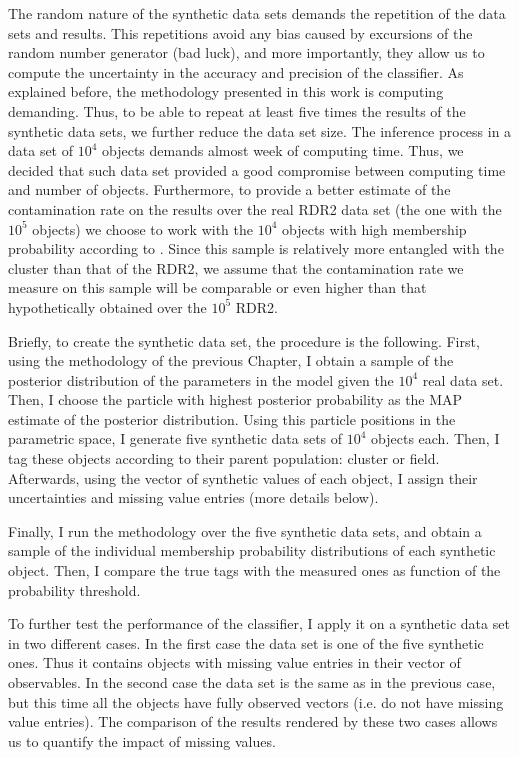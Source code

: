 The random nature of the synthetic data sets demands the repetition of the data sets and results. This repetitions avoid any bias caused by excursions of the random number generator (bad luck), and more importantly, they allow us to compute the uncertainty in the accuracy and precision of the classifier. As explained before, the methodology presented in this work is computing demanding. Thus, to be able to repeat at least five times the results of the synthetic data sets, we further reduce the data set size. The inference process in a data set of $10^4$ objects demands almost week of computing time. Thus, we decided that such data set provided a good compromise between computing time and number of objects. Furthermore, to provide a better estimate of the contamination rate on the results over the real RDR2 data set (the one with the $10^5$ objects) we choose to work with the $10^4$ objects with high membership probability according to \citet{Bouy2015}. Since this sample is relatively more entangled with the cluster than that of the RDR2, we assume that the contamination rate we measure on this sample will be comparable or even higher than that hypothetically obtained over the $10^5$ RDR2. 

Briefly, to create the synthetic data set, the procedure is the following. First, using the methodology of the previous Chapter, I obtain a sample of the posterior distribution of the parameters in the model given the $10^4$ real data set. Then, I choose the particle with highest posterior probability as the MAP estimate of the posterior distribution. Using this particle positions in the parametric space, I generate five synthetic data sets of $10^4$ objects each. Then, I tag these objects according to their parent population: cluster or field. Afterwards, using the vector of synthetic values of each object, I assign their uncertainties and missing value entries (more details  below).

Finally, I run the methodology over the five synthetic data sets, and obtain a sample of the individual membership probability distributions of each synthetic object. Then, I compare the true tags with the measured ones as function of the probability threshold. 

To further test the performance of the classifier, I apply it on a synthetic data set in two different cases. In the first case the data set is one of the five synthetic ones. Thus it contains objects with missing value entries in their vector of observables.  In the second case the data set is the same as in the previous case, but this time all the objects have fully observed vectors (i.e. do not have missing value entries). The comparison of the results rendered by these two cases allows us to quantify the impact of missing values. 

